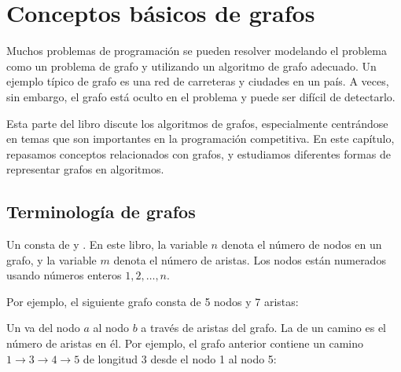 \chapter{Conceptos básicos de grafos}

Muchos problemas de programación se pueden resolver
modelando el problema como un problema de grafo
y utilizando un algoritmo de grafo adecuado.
Un ejemplo típico de grafo es una red
de carreteras y ciudades en un país.
A veces, sin embargo, el grafo está oculto
en el problema y puede ser difícil de detectarlo.

Esta parte del libro discute los algoritmos de grafos,
especialmente centrándose en temas que
son importantes en la programación competitiva.
En este capítulo, repasamos conceptos
relacionados con grafos,
y estudiamos diferentes formas de representar grafos en algoritmos.

\section{Terminología de grafos}


Un  consta de 
y . En este libro,
la variable $n$ denota el número de nodos
en un grafo, y la variable $m$ denota
el número de aristas.
Los nodos están numerados
usando números enteros $1,2,\ldots,n$.

Por ejemplo, el siguiente grafo consta de 5 nodos y 7 aristas:

\begin{center}
\end{center}


Un  va del nodo $a$ al nodo $b$
a través de aristas del grafo.
La  de un camino es el número de
aristas en él.
Por ejemplo, el grafo anterior contiene
un camino $1 \rightarrow 3 \rightarrow 4 \rightarrow 5$
de longitud 3
desde el nodo 1 al nodo 5:

